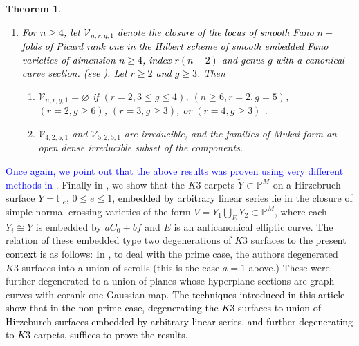 \documentclass[11pt,twoside]{amsart}
\theoremstyle{plain}
\numberwithin{equation}{section}
\newtheorem{theorem}{Theorem}[section]
\theoremstyle{definition}
\begin{document}
\begin{theorem}
\begin{enumerate}
\item \textcolor{black}{For $n \geq 4$, let $\mathcal{V}_{n,r,g,1}$ denote the closure of the locus of smooth Fano $n-$ folds of Picard rank one in the Hilbert scheme of smooth embedded Fano varieties of dimension $n \geq 4$, index $r(n-2)$ and genus $g$ with a canonical curve section. (see ). Let $r \geq 2$ and $g \geq 3$}.
Then 
\begin{enumerate}
    \item $\mathcal{V}_{n,r,g,1} = \varnothing$ if $(r = 2, 3 \leq g \leq 4)$, $(n \geq 6, r = 2, g = 5)$, $(r = 2, g \geq 6)$, $(r = 3, g \geq 3)$, or $(r = 4, g \geq 3)$ . 
    \item $\mathcal{V}_{4,2,5,1}$ and $\mathcal{V}_{5,2,5,1}$ are irreducible, and the families of Mukai form an open dense irreducible subset of the components.
\end{enumerate}

\end{enumerate} 

\end{theorem}


\textcolor{blue}{Once again, we point out that the above results was proven using very different methods in \cite{CLM98}}.
Finally in , we show that the $K3$ carpets $\widetilde{Y} \subset \mathbb{P}^M$ %
on a Hirzebruch surface $Y=\mathbb{F}_e$, $0 \leq e \leq 1$, \textcolor{black}{embedded by arbitrary linear series} 
lie in the closure of simple normal crossing varieties of the form $V = Y_1 \bigcup_E Y_2 \subset \mathbb{P}^M$, where each $Y_i \cong Y$ is embedded by $aC_0+bf$ and $E$ is an anticanonical elliptic curve.  The relation of these embedded type two degenerations of $K3$ surfaces \textcolor{black}{to the present context is} as follows: In \cite{CLM93}, to deal with the prime case, the authors degenerated $K3$ surfaces into a union of scrolls (this is the case $a=1$ above.) These were further degenerated to a union of planes whose hyperplane sections are graph curves with corank one Gaussian map. \textcolor{black}{The techniques introduced in this article show that in the non-prime case, degenerating the $K3$ surfaces to union of Hirzeburch surfaces embedded by arbitrary linear series, and further degenerating to $K3$ carpets, suffices to prove the results.} %
\end{document}
